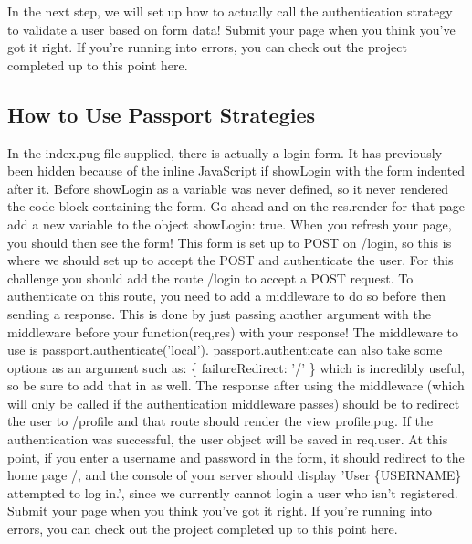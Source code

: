 \documentclass{article}%
\begin{document}
In the next step, we will set up how to actually call the authentication strategy to validate a user based on form data!\newline%
Submit your page when you think you've got it right. If you're running into errors, you can check out the project completed up to this point here.\newline%

%
\subsection{How to Use Passport Strategies}%
\label{subsec:HowtoUsePassportStrategies}%
In the index.pug file supplied, there is actually a login form. It has previously been hidden because of the inline JavaScript if showLogin with the form indented after it. Before showLogin as a variable was never defined, so it never rendered the code block containing the form. Go ahead and on the res.render for that page add a new variable to the object showLogin: true. When you refresh your page, you should then see the form! This form is set up to POST on /login, so this is where we should set up to accept the POST and authenticate the user.\newline%
For this challenge you should add the route /login to accept a POST request. To authenticate on this route, you need to add a middleware to do so before then sending a response. This is done by just passing another argument with the middleware before your function(req,res) with your response! The middleware to use is passport.authenticate('local').\newline%
passport.authenticate can also take some options as an argument such as: \{ failureRedirect: '/' \} which is incredibly useful, so be sure to add that in as well. The response after using the middleware (which will only be called if the authentication middleware passes) should be to redirect the user to /profile and that route should render the view profile.pug.\newline%
If the authentication was successful, the user object will be saved in req.user.\newline%
At this point, if you enter a username and password in the form, it should redirect to the home page /, and the console of your server should display 'User \{USERNAME\} attempted to log in.', since we currently cannot login a user who isn't registered.\newline%
Submit your page when you think you've got it right. If you're running into errors, you can check out the project completed up to this point here.\newline%
\end{document}
